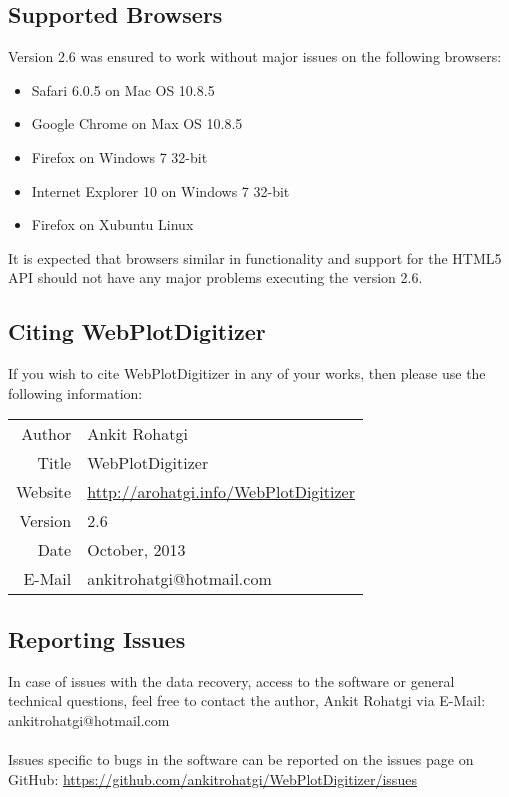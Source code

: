 \documentclass[letterpaper]{article}
\begin{document}
\subsection{Supported Browsers}
Version 2.6 was ensured to work without major issues on the following browsers:
\begin{itemize}
\item{Safari 6.0.5 on Mac OS 10.8.5}
\item{Google Chrome on Max OS 10.8.5}
\item{Firefox on Windows 7 32-bit}
\item{Internet Explorer 10 on Windows 7 32-bit}
\item{Firefox on Xubuntu Linux}
\end{itemize}
It is expected that browsers similar in functionality and support for the HTML5 API should not have any major problems executing the version 2.6.

\subsection{Citing WebPlotDigitizer}
If you wish to cite WebPlotDigitizer in any of your works, then please use the following information:

\begin{center}
\begin{tabular}{|r|l|}
\hline
Author & Ankit Rohatgi\\
Title & WebPlotDigitizer\\
Website & \url{http://arohatgi.info/WebPlotDigitizer}\\
Version & 2.6\\
Date & October, 2013\\
E-Mail & ankitrohatgi@hotmail.com\\
\hline
\end{tabular}
\end{center}


\subsection{Reporting Issues}
In case of issues with the data recovery, access to the software or general technical questions, feel free to contact the author, Ankit Rohatgi via E-Mail: ankitrohatgi@hotmail.com
\\
\\
Issues specific to bugs in the software can be reported on the issues page on GitHub: \url{https://github.com/ankitrohatgi/WebPlotDigitizer/issues}
\end{document}
